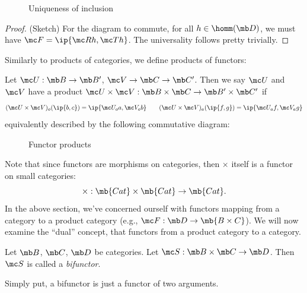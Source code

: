 \documentclass{fkbook}
\theoremstyle{snazzydefinition}
\begin{document}
\begin{adjustwidth}{1em}{1em}
\begin{theorem}
\begin{figure}[H]
      \caption{Uniqueness of inclusion}
    \end{figure}
  \end{theorem}
  \begin{proof} (Sketch) For the diagram to commute, for all $h \in
    \homm(\mb D)$, we must have $\mc F = \ip{\mc R h, \mc T h}$. The
    universality follows pretty trivially.
  \end{proof}
  Similarly to products of categories, we define products of functors:
  \begin{definition}
    Let $\mc U : \mb B \to \mb B'$, $\mc V \to \mb C \to \mb C'$. Then
    we say $\mc U$ and $\mc V$ have a product $\mc U \times \mc V :
    \mb B \times \mb C \to \mb B' \times \mb C'$ if
    \[
      (\mc U \times \mc V)_o(\ip{b,c}) = \ip{\mc U_o a, \mc V_o b} \qquad
      (\mc U \times \mc V)_a(\ip{f,g}) = \ip{\mc U_a f, \mc V_a g}
    \]
    equivalently described by the following commutative diagram:
    \begin{figure}[H]
      \centering
      \caption{Functor products}
    \end{figure}
  \end{definition}
  Note that since functors are morphisms on categories, then $\times$
  itself is a functor on small categories:
  \[
    \times : \mb{Cat} \times \mb{Cat} \to \mb{Cat}.
  \]
  In the above section, we've concerned ourself with functors mapping
  from a category to a product category (e.g., $\mc F : \mb D \to
  \mb{B \times C}$). We will now examine the ``dual'' concept, that
  functors from a product category to a category.
  \begin{definition}[Bifunctor]
    Let $\mb B$, $\mb C$, $\mb D$ be categories. Let $\mc S : \mb B
    \times \mb C \to \mb D$. Then $\mc S$ is called a
    \emph{bifunctor}.
  \end{definition}
  Simply put, a bifunctor is just a functor of two arguments.


\end{adjustwidth}
\end{document}
